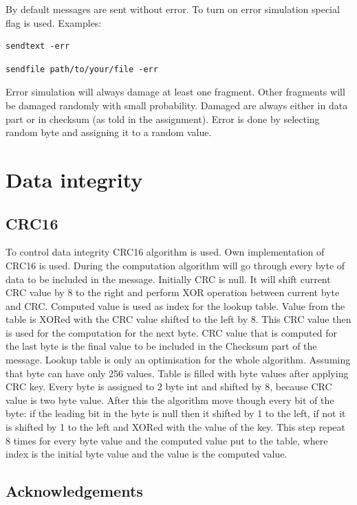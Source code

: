 \documentclass{article}
\begin{document}
By default messages are sent without error. To turn on error simulation special flag is used. Examples:
\begin{lstlisting}
sendtext -err
\end{lstlisting}
\begin{lstlisting}
sendfile path/to/your/file -err
\end{lstlisting}

Error simulation will always damage at least one fragment. Other fragments will be damaged randomly with small probability. Damaged are always either in data part or in checksum (as told in the assignment). Error is done by selecting random byte and assigning it to a random value.

\newpage

\section{Data integrity}


\subsection{CRC16}

To control data integrity CRC16 algorithm is used. 
Own implementation of CRC16 is used.
During the computation algorithm will go  through every byte of data to be included in the message. Initially CRC is null. It will shift current CRC value by 8 to the right and perform XOR operation between current byte and CRC. Computed value is used as index for the lookup table. Value from the table is XORed with the CRC value shifted to the left by 8. This CRC value then is used for the computation for the next byte. CRC value that is computed for the last byte is the final value to be included in the Checksum part of the message. \newline
Lookup table is only an optimisation for the whole algorithm. Assuming that byte can have only 256 values.
Table is filled with byte values after applying CRC key. Every byte is assigned to 2 byte int and shifted by 8, because CRC value is two byte value. After this the algorithm move though every bit of the byte: if the leading bit in the byte is null then it shifted by 1 to the left, if not it is shifted by 1 to the left and XORed with the value of the key. This step repeat 8 times for every byte value and the computed value put to the table, where index is the initial byte value and the value is the computed value.

\subsection{Acknowledgements}
\end{document}
